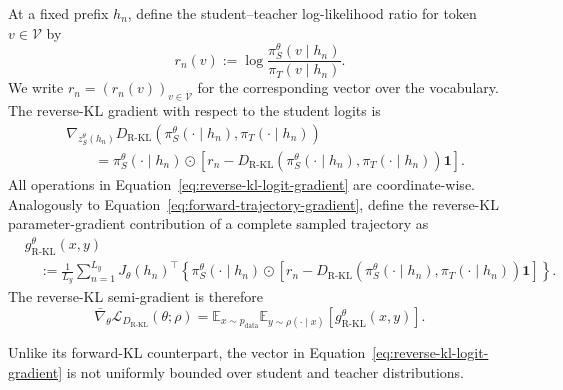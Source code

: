 \documentclass{article} %
\theoremstyle{plain}
\theoremstyle{definition}
\theoremstyle{remark}
\begin{document}
At a fixed prefix $h_n$, define the student--teacher log-likelihood ratio for
token $v\in\mathcal V$ by
\begin{equation}
    r_n(v)
    :=
    \log
    \frac{
        \pi_S^\theta(v\mid h_n)
    }{
        \pi_T(v\mid h_n)
    }.
    \label{eq:reverse-log-ratio-vector}
\end{equation}
We write $r_n=(r_n(v))_{v\in\mathcal V}$ for the corresponding vector over
the vocabulary.
The reverse-KL gradient with respect to the student logits is
\begin{align}
    &\nabla_{z_S^\theta(h_n)}
    D_{\mathrm{R\text{-}KL}}\left(
        \pi_S^\theta(\cdot\mid h_n),
        \pi_T(\cdot\mid h_n)
    \right)\nonumber\\
    &\qquad=
    \pi_S^\theta(\cdot\mid h_n)
    \odot
    \left[
        r_n
        -
        D_{\mathrm{R\text{-}KL}}\left(
            \pi_S^\theta(\cdot\mid h_n),
            \pi_T(\cdot\mid h_n)
        \right)\mathbf 1
    \right].
    \label{eq:reverse-kl-logit-gradient}
\end{align}
All operations in Equation~\ref{eq:reverse-kl-logit-gradient} are
coordinate-wise.  Analogously to
Equation~\ref{eq:forward-trajectory-gradient}, define the reverse-KL
parameter-gradient contribution of a complete sampled trajectory as
\begin{align}
    &g_{\mathrm{R\text{-}KL}}^\theta(x,y)\nonumber\\
    &\quad:=
    \frac{1}{L_y}\sum_{n=1}^{L_y}
    J_\theta(h_n)^\top
    \left\{
        \pi_S^\theta(\cdot\mid h_n)
        \odot
        \left[
            r_n
            -
            D_{\mathrm{R\text{-}KL}}\left(
                \pi_S^\theta(\cdot\mid h_n),
                \pi_T(\cdot\mid h_n)
            \right)\mathbf 1
        \right]
    \right\}.
    \label{eq:reverse-trajectory-gradient}
\end{align}
The reverse-KL semi-gradient is therefore
\begin{equation}
    \bar\nabla_\theta
    \mathcal L_{D_{\mathrm{R\text{-}KL}}}(\theta;\rho)
    =
    \mathbb E_{x\sim p_{\mathrm{data}}}
    \mathbb E_{y\sim\rho(\cdot\mid x)}
    \left[g_{\mathrm{R\text{-}KL}}^\theta(x,y)\right].
    \label{eq:reverse-semigradient-trajectory-form}
\end{equation}

Unlike its forward-KL counterpart, the vector in
Equation~\ref{eq:reverse-kl-logit-gradient} is not uniformly bounded over
student and teacher distributions.
\end{document}
